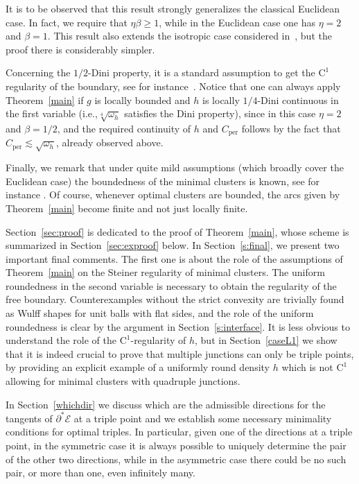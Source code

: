 \documentclass[11pt]{article}
\newcommand{\ie}{i.e.,\xspace}
\numberwithin{equation}{section}
\newcommand\Ceeb{C_\mathrm{per}}
\theoremstyle{plain}
\theoremstyle{definition}
\begin{document}
It is to be observed that this result strongly generalizes the classical Euclidean case. In fact, we require that $\eta\beta\geq 1$, while in the Euclidean case one has $\eta=2$ and $\beta=1$. This result also extends the isotropic case considered in~\cite{FPS1}, but the proof there is considerably simpler.

Concerning the $1/2$-Dini property, it is a standard assumption to get the $\mathrm{C}^1$ regularity of the boundary, see for instance~\cite{Tam,Mag}. Notice that one can always apply Theorem~\ref{main} if $g$ is locally bounded and $h$ is locally $1/4$-Dini continuous in the first variable (\ie $\sqrt[4]{\omega_h}$ satisfies the Dini property), since in this case $\eta=2$ and $\beta=1/2$, and the required continuity of $h$ and $\Ceeb$ follows by the fact that $\Ceeb\lesssim \sqrt{\omega_h}$, already observed above.

Finally, we remark that under quite mild assumptions (which broadly cover the Euclidean case) the boundedness of the minimal clusters is known, see for instance \hbox{\cite{CP,DFP,PS18,PS19}}. Of course, whenever optimal clusters are bounded, the arcs given by Theorem~\ref{main} become finite and not just locally finite.

Section~\ref{sec:proof} is dedicated to the proof of Theorem~\ref{main}, whose scheme is summarized in Section~\ref{sec:exproof} below. In Section~\ref{s:final}, we present two important final comments. The first one is about the role of the assumptions of Theorem~\ref{main} on the Steiner regularity of minimal clusters. The uniform roundedness in the second variable is necessary to obtain the regularity of the free boundary. Counterexamples without the strict convexity are trivially found as Wulff shapes for unit balls with flat sides, and the role of the uniform roundedness is clear by the argument in Section~\ref{s:interface}. It is less obvious to understand the role of the $\mathrm{C}^1$-regularity of $h$, but in Section~\ref{caseL1} we show that it is indeed crucial to prove that multiple junctions can only be triple points, by providing an explicit example of a uniformly round density $h$ which is not $\mathrm{C}^1$ allowing for minimal clusters with quadruple junctions.

In Section~\ref{whichdir} we discuss which are the admissible directions for the tangents of $\partial^*\mathcal E$ at a triple point and we establish some necessary minimality conditions for optimal triples. In particular, given one of the directions at a triple point, in the symmetric case it is always possible to uniquely determine the pair of the other two directions, while in the asymmetric case there could be no such pair, or more than one, even infinitely many.
\end{document}
